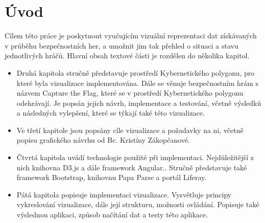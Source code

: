 \documentclass[
  digital, %
  oneside, %
  table,   %
  nolof,     %
  nolot,     %
]{fithesis3}
\begin{document}
\chapter{Úvod}

Cílem této práce je poskytnout vyučujícím vizuální reprezentaci dat získávaných v průběhu bezpečnostních her, a umožnit jim tak přehled o situaci a stavu jednotlivých hráčů.
Hlavní obsah textové části je rozdělen do několika kapitol.
\begin{itemize}
  \item Druhá kapitola stručně představuje prostředí Kybernetického polygonu, pro které byla vizualizace implementována. Dále se věnuje bezpečnostním hrám s názvem Capture the Flag, které se v prostředí Kybernetického polygonu odehrávají. Je popsán jejich návrh, implementace a testování, včetně výsledků a následných vylepšení, které se týkají také této vizualizace.
  \item Ve třetí kapitole jsou popsány cíle vizualizace a požadavky na ni, včetně popisu grafického návrhu od Bc. Kristíny Zákopčanové.
  \item Čtvrtá kapitola uvádí technologie použité při implementaci. Nejdůležitější z nich knihovna D3.js a dále framework Angular.. Stručně představuje také framework Bootstrap, knihovnu Papa Parse a portál Liferay.
  \item Pátá kapitola popisuje implementaci vizualizace. Vysvětluje principy vykreslování vizualizace, dále její strukturu, možnosti ovládání. Popisuje také výslednou aplikaci, způsob načítání dat a testy této aplikace.
\end{itemize}
\end{document}

